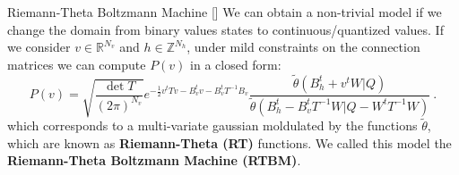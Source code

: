 \documentclass[10pt]{beamer}
\begin{document}
\begin{frame}{Riemann-Theta Boltzmann Machine \hfill \small [\cite{2020}]}
    We can obtain a non-trivial model if we change the domain from binary values states to continuous/quantized values.
    If we consider $v \in \mathbb{R}^{N_v}$ and $h \in \mathbb{Z}^{N_h}$, under mild constraints
    on the connection matrices we can compute $P(v)$ in a closed form:
    \begin{equation*}
        P(v) = \sqrt{\frac{\det T}{(2\pi)^{N_v}}} e^{- \frac{1}{2} v^t T v - B_v^t v - B_v^t T^{-1} B_v}
            \frac{\tilde{\theta}(B^t_h+v^t W \vert Q)}
            {\tilde{\theta}(B^t_h-B_v^t T^{-1} W \vert Q - W^t T^{-1} W)} \ .
    \end{equation*}
    which corresponds to a multi-variate gaussian moldulated by the functions $\tilde{\theta}$, which
    are known as \textbf{Riemann-Theta (RT)} functions.
    \newline
    We called this model the \textbf{Riemann-Theta Boltzmann Machine (RTBM)}. 


\end{frame}
\end{document}
